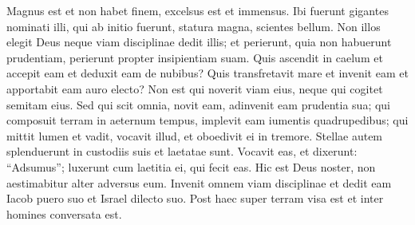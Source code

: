 \begin{biblechapter}
\verse Magnus est et non habet finem, excelsus est et immensus. 
\verse Ibi fuerunt gigantes nominati illi, qui ab initio fuerunt, statura magna, scientes bellum. 
\verse Non illos elegit Deus neque viam disciplinae dedit illis; 
\verse et perierunt, quia non habuerunt prudentiam, perierunt propter insipientiam suam. 
\verse Quis ascendit in caelum et accepit eam et deduxit eam de nubibus? 
\verse Quis transfretavit mare et invenit eam et apportabit eam auro electo? 
\verse Non est qui noverit viam eius, neque qui cogitet semitam eius. 
\verse Sed qui scit omnia, novit eam, adinvenit eam prudentia sua; qui composuit terram in aeternum tempus, implevit eam iumentis quadrupedibus; 
\verse qui mittit lumen et vadit, vocavit illud, et oboedivit ei in tremore. 
\verse Stellae autem splenduerunt in custodiis suis et laetatae sunt. 
\verse Vocavit eas, et dixerunt: “Adsumus”; luxerunt cum laetitia ei, qui fecit eas. 
\verse Hic est Deus noster, non aestimabitur alter adversus eum. 
\verse Invenit omnem viam disciplinae et dedit eam Iacob puero suo et Israel dilecto suo. 
\verse Post haec super terram visa est et inter homines conversata est. 
\end{biblechapter}

